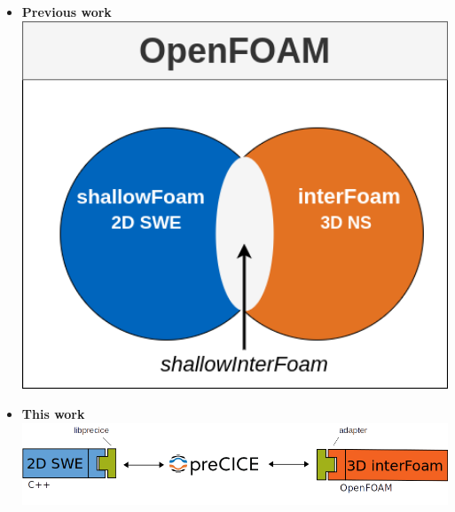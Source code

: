 \begin{frame}
\begin{minipage}{0.3\textwidth}
\begin{itemize}
\item<1->[] {\Large \textbf{Previous work}}\\[1.5cm]
\includegraphics[width=1\textwidth]{Resources/Images/Mintgenwork.png}
\end{itemize}
\end{minipage}
\hspace{3cm}
\begin{minipage}{0.5\textwidth}
\vspace{-2.2cm}
\begin{itemize}
\item<2->[] {\Large \textbf{This work}}\\[3cm]
\includegraphics[width=1\textwidth]{Resources/Images/pash2.png}
\end{itemize}
\end{minipage}



\end{frame}
